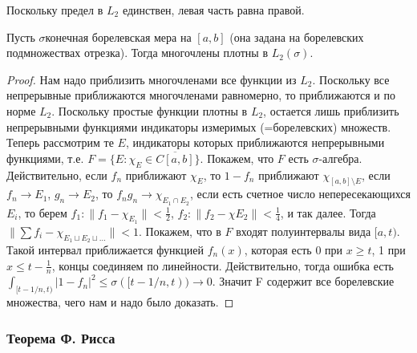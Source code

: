 \documentclass[a4paper]{article}
\begin{document}
Поскольку предел в $L_2$ единствен, левая часть равна правой.

\begin{lemma}
Пусть $\sigma$\т конечная борелевская мера на $[a,b]$ ( она задана на борелевских подмножествах отрезка).
Тогда многочлены плотны в $L_2(\sigma)$.
\end{lemma}
\begin{proof}
Нам надо приблизить многочленами все функции из $L_2$. Поскольку
все непрерывные приближаются многочленами равномерно, то приближаются и по норме
$L_2$. Поскольку простые функции плотны в $L_2$, остается лишь приблизить непрерывными функциями
индикаторы измеримых (=борелевских) множеств. Теперь рассмотрим те $E$, индикаторы которых
приближаются непрерывными функциями, т.е. $F=\{E:\chi_E\in\overline{C[a,b]}\}$. Покажем, что $F$ есть
$\sigma$-алгебра. Действительно, если $f_n$ приближают $\chi_E$, то $1-f_n$ приближают
$\chi_{[a,b]\setminus E}$, если $f_n\to E_1$, $g_n\to E_2$, то $f_ng_n\to \chi_{E_1\cap E_2}$,
если есть счетное число непересекающихся $E_i$, то берем $f_1:\|f_1-\chi_{E_1}\|<\frac12$,
$f_2:\|f_2-\chi{E_2}\|<\frac14$, и так далее. Тогда $\|\sum f_i-\chi_{E_1\sqcup E_2\sqcup\ldots}\|<1$.
Покажем, что в $F$ входят полуинтервалы вида $[a,t)$. Такой интервал приближается функцией $f_n(x)$,
которая есть 0 при $x\ge t$, 1 при $x\le t-\frac{1}{n}$, концы соединяем по линейности. Действительно,
тогда ошибка есть $\int_{[t-1/n,t)} |1-f_n|^2 \le \sigma([t-1/n,t)) \to 0$.
Значит F содержит все борелевские множества, чего нам и надо было доказать.
\end{proof}

\subsubsection{Теорема Ф. Рисса}
\end{document}

